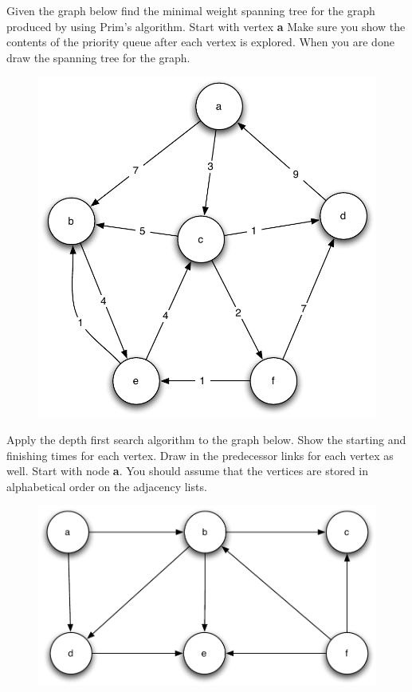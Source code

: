 \documentclass[11pt]{exam}
\begin{document}
\begin{questions}
\question[10] Given the graph below find the minimal weight spanning tree for the graph produced by using Prim's algorithm. Start with vertex \textbf{a} Make sure you show the contents of the priority queue after each vertex is explored.  When you are done draw the spanning tree for the graph.
\begin{figure}[h!t]
        \begin{center}
        \includegraphics[scale=.75]{spanning}
    \end{center}
\end{figure}

\newpage
\question[10] Apply the depth first search algorithm to the graph below. Show the starting and finishing times for each vertex.  Draw in the  predecessor links for each vertex as well.  Start with node \textbf{a}.  You should assume that the vertices are stored in alphabetical order on the adjacency lists.
\begin{figure}[h!t]
        \begin{center}
        \includegraphics[scale=.75]{dfs}
    \end{center}
\end{figure}

\end{questions}
\end{document}
